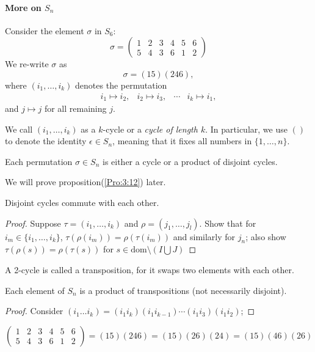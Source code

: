 \paragraph{More on $S_n$}
Consider the element $\sigma$ in $S_6$:
\[
\sigma=\begin{pmatrix}
1&2&3&4&5&6\\5&4&3&6&1&2
\end{pmatrix}
\]
We re-write $\sigma$ as
\[
\sigma=(15)(246),
\]
where $(i_1,\dots,i_k)$ denotes the permutation
\[
\begin{array}{llll}
i_1\mapsto i_2,
&
i_2\mapsto i_3,
&\cdots&i_k\mapsto i_1,
\end{array}
\]
and $j\mapsto j$ for all remaining $j$.
\begin{definition}[cycle]
We call $(i_1,\dots,i_k)$ as a $k$-cycle or a \emph{cycle of length $k$}. In particular, we use $()$ to denote the identity $\epsilon\in S_n$, meaning that it fixes all numbers in $\{1,\dots,n\}.$
\end{definition}
\begin{proposition}\label{Pro:3:12}
Each permutation $\sigma\in S_n$ is either a cycle or a product of disjoint cycles.
\end{proposition}
We will prove proposition(\ref{Pro:3:12}) later.
\begin{proposition}
Disjoint cycles commute with each other.
\end{proposition}
\begin{proof}
Suppose $\tau=(i_1,\dots,i_k)$ and $\rho=(j_1,\dots,j_l)$. Show that for $i_m\in\{i_1,\dots,i_k\}$, $\tau(\rho(i_m))=\rho(\tau(i_m))$ and similarly for $j_n$; also show $\tau(\rho(s)) = \rho(\tau(s)) $ for $s\in\mbox{dom}\setminus(I\bigcup J)$
\end{proof}
\begin{definition}[Transposition]
A 2-cycle is called a transposition, for it swaps two elements with each other.
\end{definition}
\begin{proposition}
Each element of $S_n$ is a product of transpositions (not necessarily disjoint).
\end{proposition}
\begin{proof}
Consider $(i_1\dots i_k) = (i_1i_k)(i_1i_{k-1})\cdots(i_1i_3)(i_1i_2)$;
\end{proof}
\begin{example}
\[
\begin{pmatrix}
1&2&3&4&5&6\\
5&4&3&6&1&2
\end{pmatrix}
=
(15)(246)
=
(15)(26)(24)
=
(15)(46)(26)
\]
\end{example}
